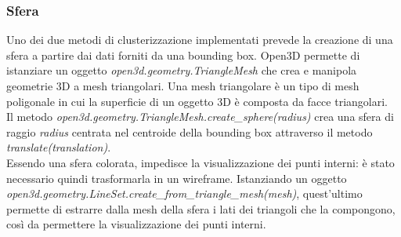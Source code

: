 \documentclass[italian]{article}
\begin{document}
\subsubsection{Sfera}
Uno dei due metodi di clusterizzazione implementati prevede la creazione di una sfera a partire dai dati forniti da una bounding box. Open3D permette di istanziare un oggetto \textit{open3d.geometry.TriangleMesh} che crea e manipola geometrie 3D a mesh triangolari. Una mesh triangolare è un tipo di mesh poligonale in cui la superficie di un oggetto 3D è composta da facce triangolari.\\
Il metodo \textit{open3d.geometry.TriangleMesh.create\_sphere(radius)} crea una sfera di raggio \textit{radius} centrata nel centroide della bounding box attraverso il metodo \textit{translate(translation)}.\\
Essendo una sfera colorata, impedisce la visualizzazione dei punti interni: è stato necessario quindi trasformarla in un wireframe. Istanziando un oggetto\\ \textit{open3d.geometry.LineSet.create\_from\_triangle\_mesh(mesh)}, quest'ultimo permette di estrarre dalla mesh della sfera i lati dei triangoli che la compongono, così da permettere la visualizzazione dei punti interni.\\
\end{document}
